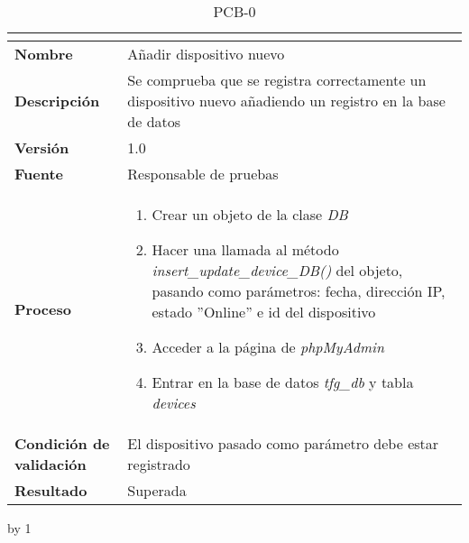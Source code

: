 \begin{table}[H]
	\caption{PCB-0\number\pcb}
	\begin{tabular}{|l|p{}|}
		\hline
		\multicolumn{2}{|c|}{\cellcolor[HTML]{BFBFBF}{\color[HTML]{000000} \textbf{PCB-0\number\pcb}}} \\ \hline
		\textbf{Nombre}                  & Añadir dispositivo nuevo                                                                                  \\ \hline
		\textbf{Descripción}             & Se comprueba que se registra correctamente un dispositivo nuevo añadiendo un registro en la base de datos \\ \hline
		\textbf{Versión}                 & 1.0                                                                                                       \\ \hline
		\textbf{Fuente}                  & Responsable de pruebas                                                                                    \\ \hline
		\textbf{Proceso}                 & \begin{enumerate}
			\item Crear un objeto de la clase \textit{DB}
			\item Hacer una llamada al método \textit{insert\_update\_device\_DB()} del objeto, pasando como parámetros: fecha, dirección IP, estado ''Online'' e id del dispositivo
			\item Acceder a la página de \textit{phpMyAdmin}
			\item Entrar en la base de datos \textit{tfg\_db} y tabla \textit{devices}
		\end{enumerate}                                                                                 \\ \hline
		\textbf{Condición de validación} & El dispositivo pasado como parámetro debe estar registrado                                                \\ \hline
		\textbf{Resultado}               & Superada                                                                                                  \\ \hline
	\end{tabular}
\end{table}
\advance\pcb by 1
